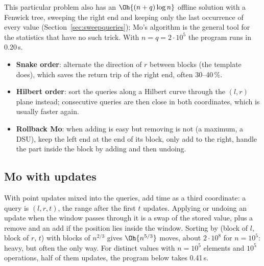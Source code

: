 
This particular problem also has an $\Oh{(n + q) \log n}$ offline solution with a Fenwick tree, sweeping the right end and keeping
only the last occurrence of every value (Section~\ref{sec:sweepqueries}); Mo's algorithm is the general tool for the statistics that have
no such trick. With $n = q = 2 \cdot 10^5$ the program runs in 0.20\,s.

\begin{trick}
\begin{itemize}
  \item \textbf{Snake order}: alternate the direction of $r$ between blocks (the template does), which saves the return trip of the
        right end, often 30--40\,\%.
  \item \textbf{Hilbert order}: sort the queries along a Hilbert curve through the $(l, r)$ plane instead; consecutive queries are
        then close in both coordinates, which is usually faster again.
  \item \textbf{Rollback Mo}: when adding is easy but removing is not (a maximum, a DSU), keep the left end at the end of its block,
        only add to the right, handle the part inside the block by adding and then undoing.
\end{itemize}
\end{trick}

\subsection{Mo with updates}

With point updates mixed into the queries, add time as a third coordinate: a query is $(l, r, t)$, the range after the first $t$
updates. Applying or undoing an update when the window passes through it is a swap of the stored value, plus a remove and an add if
the position lies inside the window. Sorting by (block of $l$, block of $r$, $t$) with blocks of $n^{2/3}$ gives $\Oh{n^{5/3}}$ moves,
about $2 \cdot 10^8$ for $n = 10^5$: heavy, but often the only way. For distinct values with $n = 10^5$ elements and $10^5$
operations, half of them updates, the program below takes 0.41\,s.

